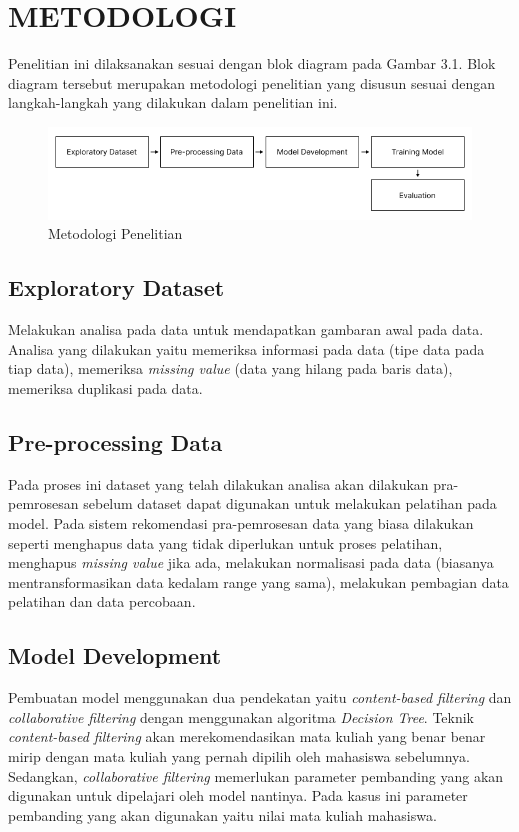 \section{METODOLOGI}

Penelitian ini dilaksanakan sesuai dengan blok diagram pada Gambar 3.1. Blok diagram tersebut
merupakan metodologi penelitian yang disusun sesuai dengan langkah-langkah yang dilakukan dalam penelitian ini.

\begin{figure} [ht] \centering
  \includegraphics[width=160mm]{gambar/metodologi.png}
  \caption{Metodologi Penelitian}
\end{figure}


\subsection{Exploratory Dataset}
Melakukan analisa pada data untuk mendapatkan gambaran awal pada data. Analisa yang dilakukan yaitu
memeriksa informasi pada data (tipe data pada tiap data), memeriksa \emph{missing value} {(data yang hilang pada baris data)},
memeriksa duplikasi pada data.


\subsection{Pre-processing Data}
Pada proses ini dataset yang telah dilakukan analisa akan dilakukan pra-pemrosesan sebelum dataset dapat digunakan
untuk melakukan pelatihan pada model. Pada sistem rekomendasi pra-pemrosesan data yang biasa dilakukan seperti menghapus data
yang tidak diperlukan untuk proses pelatihan, menghapus \emph{missing value} jika ada, melakukan normalisasi pada data (biasanya mentransformasikan data kedalam range yang sama),
melakukan pembagian data pelatihan dan data percobaan.

\subsection{Model Development}
Pembuatan model menggunakan dua pendekatan yaitu \emph{content-based filtering} dan \emph{collaborative filtering} dengan menggunakan algoritma \emph{Decision Tree}. Teknik
\emph{content-based filtering} akan merekomendasikan mata kuliah yang benar benar mirip dengan mata kuliah yang pernah dipilih oleh mahasiswa sebelumnya. Sedangkan, \emph{collaborative filtering}
memerlukan parameter pembanding yang akan digunakan untuk dipelajari oleh model nantinya. Pada kasus ini parameter pembanding yang akan digunakan yaitu nilai mata kuliah mahasiswa.

